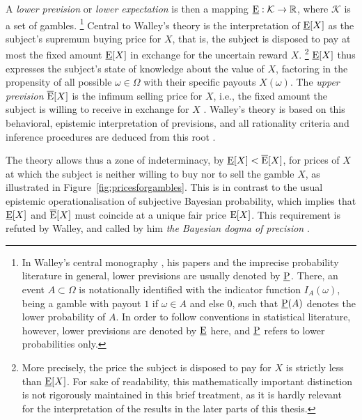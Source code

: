 A \emph{lower prevision} or \emph{lower expectation} is then a mapping
$\underline{\operatorname{E}}: \mathcal{K} \to \mathbb{R}$, where $\mathcal{K}$ is a set of gambles.%
\footnote{In Walley's central monography \parencite{1991:walley},
his papers and the imprecise probability literature in general,
lower previsions are usually denoted by $\underline{\operatorname{P}}$.
There, an event $A \subset \Omega$ is notationally identified with the
indicator function $I_A(\omega)$, being a gamble with payout $1$ if $\omega \in A$ and else $0$,
such that $\underline{\operatorname{P}}(A)$ denotes the lower probability of $A$.
In order to follow conventions in statistical literature, however,
lower previsions are denoted by $\underline{\operatorname{E}}$ here,
and $\underline{\operatorname{P}}$ refers to lower probabilities only.}
Central to Walley's theory is the interpretation of $\underline{\operatorname{E}}[X]$
as the subject's supremum buying price for $X$, that is,
the subject is disposed to pay at most the fixed amount $\underline{\operatorname{E}}[X]$
in exchange for the uncertain reward $X$.%
\footnote{More precisely, the price the subject is disposed to pay for $X$ is strictly less than $\underline{\operatorname{E}}[X]$.
For sake of readability,
this mathematically important distinction is not rigorously maintained in this brief treatment,
as it is hardly relevant for the interpretation of the results in the later parts of this thesis.}
$\underline{\operatorname{E}}[X]$ thus expresses the subject's state of knowledge about the value of $X$,
factoring in the propensity of all possible $\omega \in \Omega$
with their specific payouts $X(\omega)$.
The \emph{upper prevision} $\overline{\operatorname{E}}[X]$ is the infimum selling price for $X$,
i.e., the fixed amount the subject is willing to receive in exchange for $X$
\parencite[p.~9]{1996:walley::expert}.
Walley's theory is based on this behavioral, epistemic interpretation of previsions,
and all rationality criteria and inference procedures
are deduced from this root \parencite[p.~5]{1996:walley::expert}.

The theory allows thus a zone of indeterminacy, by $\underline{\operatorname{E}}[X] < \overline{\operatorname{E}}[X]$,
for prices of $X$ at which the subject is neither willing to buy nor to sell the gamble $X$,
as illustrated in Figure~\ref{fig:pricesforgambles}.
This is in contrast to the usual epistemic operationalisation of subjective Bayesian probability,
which implies that $\underline{\operatorname{E}}[X]$ and $\overline{\operatorname{E}}[X]$ must coincide at a unique fair price $\operatorname{E}[X]$.
This requirement is refuted by Walley, and called by him \emph{the Bayesian dogma of precision}
\parencite[\S 5]{1991:walley}.

